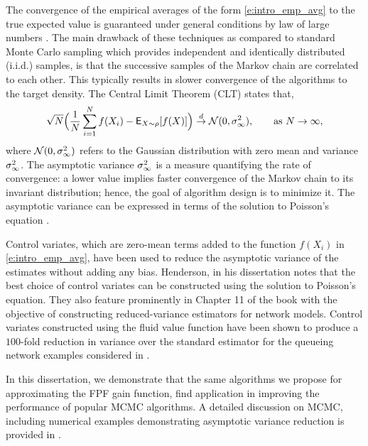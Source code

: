 The convergence of the empirical averages of the form \eqref{e:intro_emp_avg} to the true expected value is guaranteed under general conditions by law of large numbers \cite{MT}. The main drawback of these techniques as compared to standard Monte Carlo sampling which provides independent and identically distributed (i.i.d.) samples, is that the successive samples of the Markov chain are correlated to each other. This typically results in slower convergence of the algorithms to the target density. The Central Limit Theorem (CLT) states that,
\begin{equation}
\sqrt{N} \Bigl(\frac{1}{N} \sum_{i=1}^N f(X_i) - {\sf E}_{X \sim \rho} [f(X)] \Bigr) \overset{d}{\to} \mathcal{N}(0, \sigma_\infty^2),\qquad \text{as } N \to \infty, 
\end{equation}
where $\mathcal{N}(0,\sigma_\infty^2)$ refers to the Gaussian distribution with zero mean and variance $\sigma_\infty^2$. The asymptotic variance $\sigma_\infty^2$ is a measure quantifying the rate of convergence: a lower value implies faster convergence of the Markov chain to its invariant distribution; hence, the goal of algorithm design is to minimize it. The asymptotic variance can be expressed in terms of the solution to Poisson's equation \cite{ctcn}. 

Control variates, which are zero-mean terms added to the function $f(X_i)$ in \eqref{e:intro_emp_avg}, have been used to reduce the asymptotic variance of the estimates without adding any bias. Henderson, in his dissertation \cite{henthesis97} notes that the best choice of control variates can be constructed using the solution to Poisson's equation. They also feature prominently in Chapter 11 of the book \cite{ctcn} with the objective of constructing reduced-variance estimators for network models. Control variates constructed using the fluid value function have been shown to produce a $100$-fold reduction in variance over the standard estimator for the queueing network examples considered in \cite[Chapter~5]{ctcn}. 

In this dissertation, we demonstrate that the same algorithms we propose for approximating the FPF gain function, find application in improving the performance of popular MCMC algorithms. A detailed discussion on MCMC, including numerical examples demonstrating asymptotic variance reduction is provided in .


